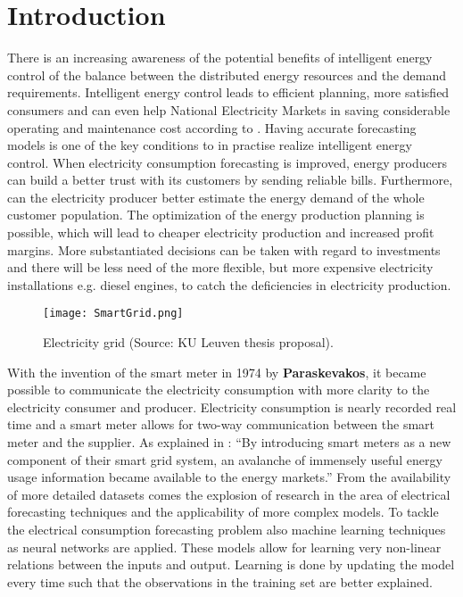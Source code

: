 \chapter{Introduction}

There is an increasing awareness of the potential benefits of intelligent energy control of the balance between the distributed energy resources and the demand requirements. Intelligent energy control leads to efficient planning, more satisfied consumers and can even help National Electricity Markets in saving considerable operating and maintenance cost according to \cite{NarjesFallah2018}. Having accurate forecasting models is one of the key conditions to in practise realize intelligent energy control. When electricity consumption forecasting is improved, energy producers can build a better trust with its customers by sending reliable bills. Furthermore, can the electricity producer better estimate the energy demand of the whole customer population. The optimization of the energy production planning is possible, which will lead to cheaper electricity production and increased profit margins. More substantiated decisions can be taken with regard to investments and there will be less need of the more flexible, but more expensive electricity installations e.g. diesel engines, to catch the deficiencies in electricity production.\\

\begin{figure}[h!]
	\centering
	\texttt{[image: SmartGrid.png]}
	\caption{Electricity grid (Source: KU Leuven thesis proposal).}
	\label{fig:power_image}
\end{figure}

With the invention of the smart meter in 1974 by \textbf{Paraskevakos}, it became possible to communicate the electricity consumption with more clarity to the electricity consumer and producer. Electricity consumption is nearly recorded real time and a smart meter allows for two-way communication between the smart meter and the supplier. As explained in \cite{Depuru2011}: ``By introducing smart meters as a new
component of their smart grid system, an avalanche of immensely useful energy usage information
became available to the energy markets.'' From the availability of more detailed datasets comes the explosion of research in the area of electrical forecasting techniques and the applicability of more complex models. To tackle the electrical consumption forecasting problem also machine learning techniques as neural networks are applied. These models allow for learning very non-linear relations between the inputs and output. Learning is done by updating the model every time such that the observations in the training set are better explained.\\

